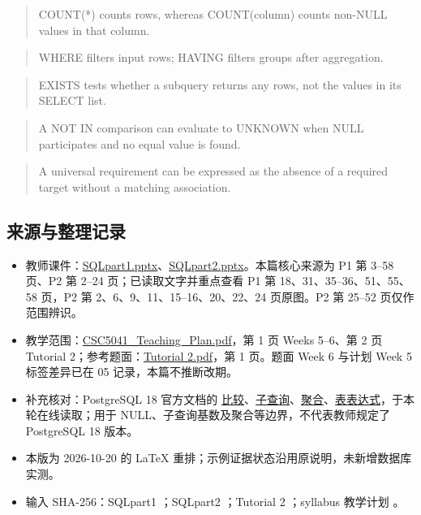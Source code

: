 \begin{quote}
COUNT(*) counts rows, whereas COUNT(column) counts non-NULL values in that column.
\end{quote}

\begin{quote}
WHERE filters input rows; HAVING filters groups after aggregation.
\end{quote}

\begin{quote}
EXISTS tests whether a subquery returns any rows, not the values in its SELECT list.
\end{quote}

\begin{quote}
A NOT IN comparison can evaluate to UNKNOWN when NULL participates and no equal value is found.
\end{quote}

\begin{quote}
A universal requirement can be expressed as the absence of a required target without a matching association.
\end{quote}

\subsection{来源与整理记录}\label{06_sql_queries_zh-ux6765ux6e90ux4e0eux6574ux7406ux8bb0ux5f55}

\begin{itemize}
\tightlist
\item
  教师课件：\href{../../../slides/SQLpart1.pptx}{SQLpart1.pptx}、\href{../../../slides/SQLpart2.pptx}{SQLpart2.pptx}。本篇核心来源为 P1 第 3--58 页、P2 第 2--24 页；已读取文字并重点查看 P1 第 18、31、35--36、51、55、58 页，P2 第 2、6、9、11、15--16、20、22、24 页原图。P2 第 25--52 页仅作范围辨识。
\item
  教学范围：\href{../../../syllabus/CSC5041_Teaching_Plan.pdf}{CSC5041\_Teaching\_Plan.pdf}，第 1 页 Weeks 5--6、第 2 页 Tutorial 2；参考题面：\href{../../../slides/Tutorial\%202.pdf}{Tutorial 2.pdf}，第 1 页。题面 Week 6 与计划 Week 5 标签差异已在 05 记录，本篇不推断改期。
\item
  补充核对：PostgreSQL 18 官方文档的 \href{https://www.postgresql.org/docs/18/functions-comparison.html}{比较}、\href{https://www.postgresql.org/docs/18/functions-subquery.html}{子查询}、\href{https://www.postgresql.org/docs/18/functions-aggregate.html}{聚合}、\href{https://www.postgresql.org/docs/18/queries-table-expressions.html}{表表达式}，于本轮在线读取；用于 NULL、子查询基数及聚合等边界，不代表教师规定了 PostgreSQL 18 版本。
\item
  本版为 2026-10-20 的 LaTeX 重排；示例证据状态沿用原说明，未新增数据库实测。
\item
  输入 SHA-256：SQLpart1 \texttt{}；SQLpart2 \texttt{}；Tutorial 2 \texttt{}；syllabus 教学计划 \texttt{}。
\end{itemize}
